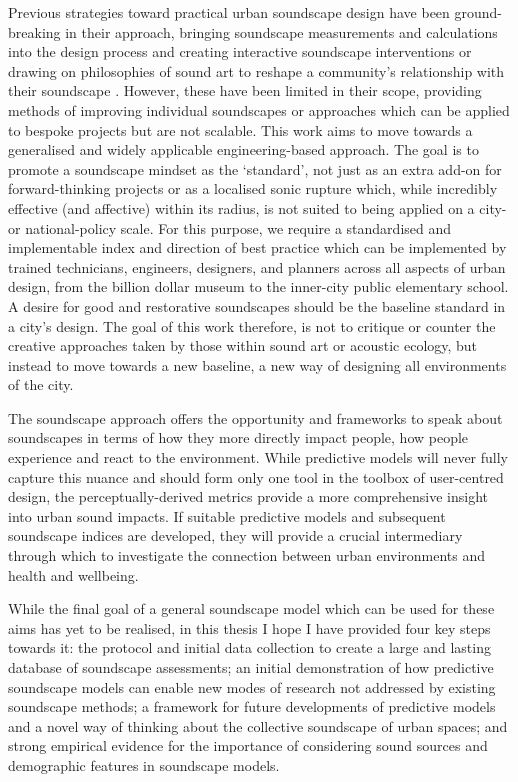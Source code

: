 Previous strategies toward practical urban soundscape design have been ground-breaking in their approach, bringing soundscape measurements and calculations into the design process \citep{SchulteFortkamp2008Using,SchulteFortkamp2016When} and creating interactive soundscape interventions \citep{Steele2021Bringing} or drawing on philosophies of sound art to reshape a community's relationship with their soundscape \citep{Lacey2016,Lacey2019Noise}. However, these have been limited in their scope, providing methods of improving individual soundscapes or approaches which can be applied to bespoke projects but are not scalable. This work aims to move towards a generalised and widely applicable engineering-based approach. The goal is to promote a soundscape mindset as the `standard', not just as an extra add-on for forward-thinking projects or as a localised sonic rupture which, while incredibly effective (and affective) within its radius, is not suited to being applied on a city- or national-policy scale. For this purpose, we require a standardised and implementable index and direction of best practice which can be implemented by trained technicians, engineers, designers, and planners across all aspects of urban design, from the billion dollar museum to the inner-city public elementary school. A desire for good and restorative soundscapes should be the baseline standard in a city's design. The goal of this work therefore, is not to critique or counter the creative approaches taken by those within sound art or acoustic ecology, but instead to move towards a new baseline, a new way of designing all environments of the city.

The soundscape approach offers the opportunity and frameworks to speak about soundscapes in terms of how they more directly impact people, how people experience and react to the environment. While predictive models will never fully capture this nuance and should form only one tool in the toolbox of user-centred design, the perceptually-derived metrics provide a more comprehensive insight into urban sound impacts. If suitable predictive models and subsequent soundscape indices are developed, they will provide a crucial intermediary through which to investigate the connection between urban environments and health and wellbeing. 

While the final goal of a general soundscape model which can be used for these aims has yet to be realised, in this thesis I hope I have provided four key steps towards it: the protocol and initial data collection to create a large and lasting database of soundscape assessments; an initial demonstration of how predictive soundscape models can enable new modes of research not addressed by existing soundscape methods; a framework for future developments of predictive models and a novel way of thinking about the collective soundscape of urban spaces; and strong empirical evidence for the importance of considering sound sources and demographic features in soundscape models.